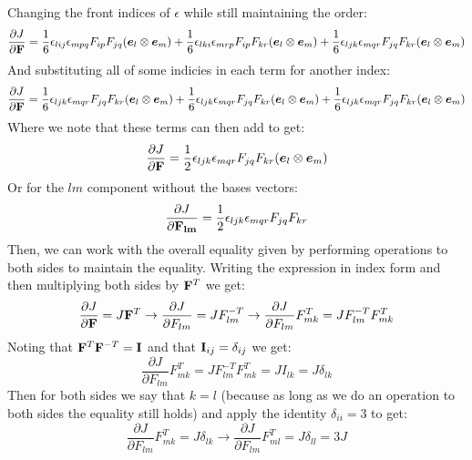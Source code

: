 Changing the front indices of $\epsilon$ while still maintaining the order:
\begin{equation}
    \frac{\partial J}{\partial \mathbf{F}} = \frac{1}{6}\epsilon_{lij}\epsilon_{mpq}F_{ip}F_{jq}(\bm{e}_l \otimes \bm{e}_m) + \frac{1}{6}\epsilon_{lki}\epsilon_{mrp}F_{ip}F_{kr}(\bm{e}_l \otimes \bm{e}_m) + \frac{1}{6}\epsilon_{ljk}\epsilon_{mqr}F_{jq}F_{kr}(\bm{e}_l \otimes \bm{e}_m)
\end{equation}
And substituting all of some indicies in each term for another index:
\begin{equation}
    \frac{\partial J}{\partial \mathbf{F}} = \frac{1}{6}\epsilon_{ljk}\epsilon_{mqr}F_{jq}F_{kr}(\bm{e}_l \otimes \bm{e}_m) + \frac{1}{6}\epsilon_{ljk}\epsilon_{mqr}F_{jq}F_{kr}(\bm{e}_l \otimes \bm{e}_m) + \frac{1}{6}\epsilon_{ljk}\epsilon_{mqr}F_{jq}F_{kr}(\bm{e}_l \otimes \bm{e}_m)
\end{equation}
Where we note that these terms can then add to get:
\begin{equation}
    \frac{\partial J}{\partial \mathbf{F}} = \frac{1}{2}\epsilon_{ljk}\epsilon_{mqr}F_{jq}F_{kr}(\bm{e}_l \otimes \bm{e}_m)
\end{equation}
Or for the $lm$ component without the bases vectors:
\begin{equation}
    \frac{\partial J}{\partial \mathbf{F_{lm}}} = \frac{1}{2}\epsilon_{ljk}\epsilon_{mqr}F_{jq}F_{kr}
\end{equation}
Then, we can work with the overall equality given by performing operations to both sides to maintain the equality. Writing the expression in index form and then multiplying both sides by $\mathbf{F}^T$ we get:
\begin{equation}
    \frac{\partial J}{\partial \mathbf{F}} = J\mathbf{F}^T \to \frac{\partial J}{\partial F_{lm}} = JF^{-T}_{lm} \to \frac{\partial J}{\partial F_{lm}}F^T_{mk} = JF^{-T}_{lm}F^T_{mk}
\end{equation}
Noting that $\mathbf{F}^T \mathbf{F}^{-T}=\mathbf{I}$ and that $\mathbf{I}_{ij} = \delta_{ij}$ we get:
\begin{equation}
    \frac{\partial J}{\partial F_{lm}}F^T_{mk} = JF^{-T}_{lm}F^T_{mk} = JI_{lk} = J\delta_{lk}
\end{equation}
Then for both sides we say that $k=l$ (because as long as we do an operation to both sides the equality still holds) and apply the identity $\delta_{ii} = 3$ to get:
\begin{equation}
    \frac{\partial J}{\partial F_{lm}}F^T_{mk} = J\delta_{lk} \to \frac{\partial J}{\partial F_{lm}}F^T_{ml} = J\delta_{ll} = 3J
\end{equation}
